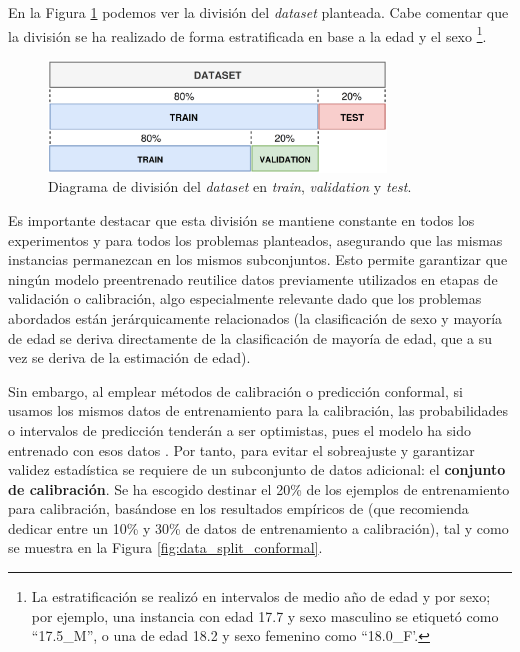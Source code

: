 En la Figura \ref{fig:data_split_base} podemos ver la división del \textit{dataset} planteada. Cabe comentar que la división se ha realizado de forma estratificada en base a la edad y el sexo%
\footnote{
    La estratificación se realizó en intervalos de medio año de edad y por sexo; por ejemplo, una instancia con edad 17.7 y sexo masculino se etiquetó como ``17.5\_M'', o una de edad 18.2 y sexo femenino como ``18.0\_F'.
}.

\begin{figure}[htbp]
    \centering
    \includegraphics[width=0.8\textwidth]{capitulos/cap_04/imagenes/data_split_base.png}
    \caption[
        Diagrama de división del \textit{dataset} en \textit{train}, \textit{validation} y \textit{test}.
    ]{
        Diagrama de división del \textit{dataset} en \textit{train}, \textit{validation} y \textit{test}. 
    } 
    \label{fig:data_split_base}
\end{figure}

Es importante destacar que esta división se mantiene constante en todos los experimentos y para todos los problemas planteados, asegurando que las mismas instancias permanezcan en los mismos subconjuntos. Esto permite garantizar que ningún modelo preentrenado reutilice datos previamente utilizados en etapas de validación o calibración, algo especialmente relevante dado que los problemas abordados están jerárquicamente relacionados (la clasificación de sexo y mayoría de edad se deriva directamente de la clasificación de mayoría de edad, que a su vez se deriva de la estimación de edad).

Sin embargo, al emplear métodos de calibración o predicción conformal, si usamos los mismos datos de entrenamiento para la calibración, las probabilidades o intervalos de predicción tenderán a ser optimistas, pues el modelo ha sido entrenado con esos datos \cite{niculescu2005}. Por tanto, para evitar el sobreajuste y garantizar validez estadística se requiere de un subconjunto de datos adicional: el \textbf{conjunto de calibración}. Se ha escogido destinar el  20\% de los ejemplos de entrenamiento para calibración, basándose en los resultados empíricos de \cite{sesia2020} (que recomienda dedicar entre un 10\% y 30\% de datos de entrenamiento a calibración), tal y como se muestra en la Figura \ref{fig:data_split_conformal}.


